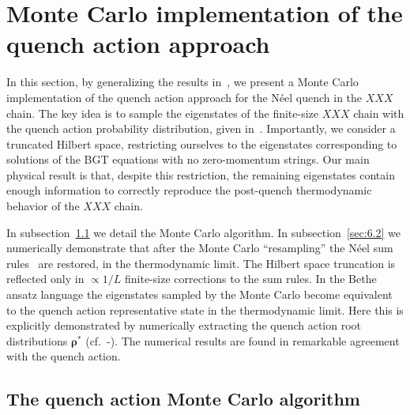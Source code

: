 \documentclass[11pt]{iopart}
\begin{document}
\section{Monte Carlo implementation of the quench action approach}
\label{sec6:mcqa}

In this section, by generalizing the results in~\cite{alba-2015}, we present 
a Monte Carlo implementation of the quench action approach for the N\'eel quench in 
the $XXX$ chain. The key idea is to sample the eigenstates of the finite-size $XXX$ 
chain with the quench action probability distribution, given in~. 
Importantly, we consider a truncated Hilbert space, restricting ourselves to the 
eigenstates corresponding to solutions of the BGT equations with no zero-momentum 
strings. Our main physical result is that, despite this restriction, the remaining 
eigenstates contain enough information to correctly reproduce the post-quench 
thermodynamic behavior of the $XXX$ chain. 

In subsection~\ref{sec:6.1} we detail the Monte Carlo algorithm. In 
subsection~\ref{sec:6.2} we numerically demonstrate that after the Monte Carlo 
``resampling'' the N\'eel sum rules~ are restored, in the 
thermodynamic limit. The Hilbert space truncation is reflected only in 
$\propto 1/L$ finite-size corrections to the sum rules. In the Bethe ansatz 
language the eigenstates sampled by the Monte Carlo become equivalent to the 
quench action representative state in the thermodynamic limit. Here this is 
explicitly demonstrated by numerically extracting the quench action root 
distributions $\pmb{\rho}^*$ (cf.~-). The 
numerical results are found in remarkable agreement with the quench action. 



\subsection{The quench action Monte Carlo algorithm}
\label{sec:6.1}
\end{document}
